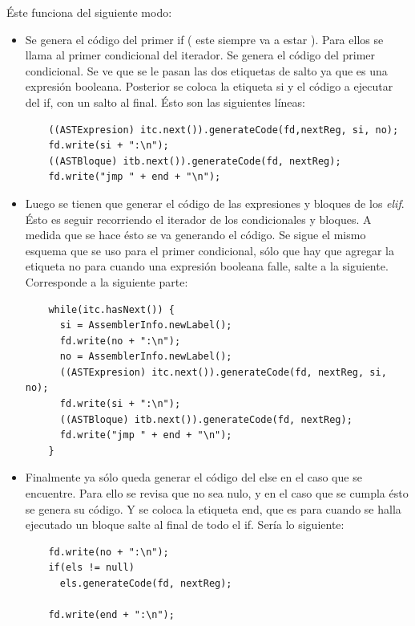 \documentclass[11pt, spanish]{report}
\begin{document}
\'Este funciona del siguiente modo: \\
  \begin{itemize}
  \item
  Se genera el c\'odigo del primer if ( este siempre va a estar ). Para ellos se llama al primer condicional del iterador. Se genera el c\'odigo del 
  primer condicional. Se ve que se le pasan las dos etiquetas de salto ya que es una expresi\'on booleana. Posterior se coloca la etiqueta si y el 
  c\'odigo a ejecutar del if, con un salto al final. \'Esto son las siguientes l\'ineas:

  \begin{verbatim}
    ((ASTExpresion) itc.next()).generateCode(fd,nextReg, si, no);
    fd.write(si + ":\n");
    ((ASTBloque) itb.next()).generateCode(fd, nextReg);
    fd.write("jmp " + end + "\n");
  \end{verbatim}

  \item
  Luego se tienen que generar el c\'odigo de las expresiones y bloques de los \emph{elif}. \'Esto es seguir recorriendo el iterador de los condicionales 
  y bloques. A medida que se hace \'esto se va generando el c\'odigo. Se sigue el mismo esquema que se uso para el primer condicional, s\'olo que hay
  que agregar la etiqueta no para cuando una expresi\'on booleana falle, salte a la siguiente. Corresponde a la siguiente parte:

  \begin{verbatim}
    while(itc.hasNext()) {
      si = AssemblerInfo.newLabel();
      fd.write(no + ":\n");
      no = AssemblerInfo.newLabel();
      ((ASTExpresion) itc.next()).generateCode(fd, nextReg, si, no);
      fd.write(si + ":\n");
      ((ASTBloque) itb.next()).generateCode(fd, nextReg);
      fd.write("jmp " + end + "\n");
    }
  \end{verbatim}

  \item
  Finalmente ya s\'olo queda generar el c\'odigo del else en el caso que se encuentre. Para ello se revisa que no sea nulo, y en el caso que se cumpla
  \'esto se genera su c\'odigo. Y se coloca la etiqueta end, que es para cuando se halla ejecutado un bloque salte al final de todo el if. 
  Ser\'ia lo siguiente:

  \begin{verbatim}
    fd.write(no + ":\n");
    if(els != null)
      els.generateCode(fd, nextReg);

    fd.write(end + ":\n");
  \end{verbatim}

  \end{itemize}
\end{document}
